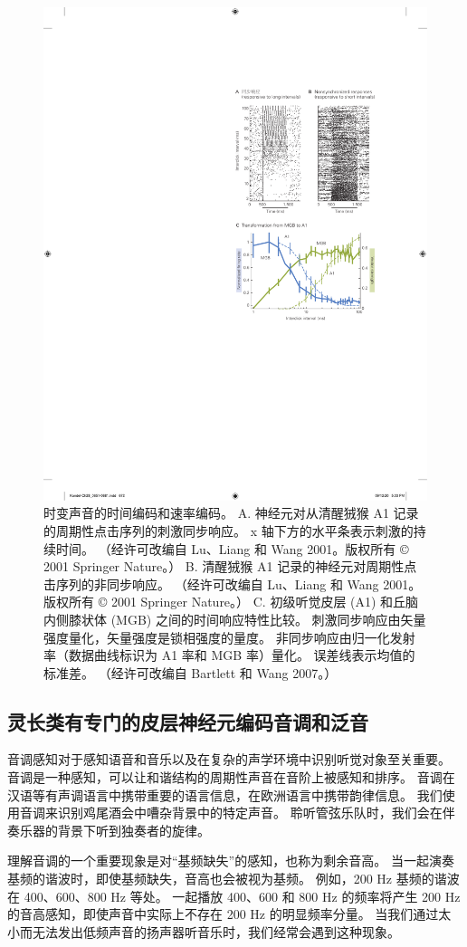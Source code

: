 \begin{figure}[htbp]
	\centering
	\includegraphics[width=0.5\linewidth]{chap28/fig_28_12}
	\caption{时变声音的时间编码和速率编码。
	A. 神经元对从清醒狨猴 A1 记录的周期性点击序列的刺激同步响应。 x 轴下方的水平条表示刺激的持续时间。 
	（经许可改编自 Lu、Liang 和 Wang 2001。版权所有 © 2001 Springer Nature。）
	B. 清醒狨猴 A1 记录的神经元对周期性点击序列的非同步响应。 
	（经许可改编自 Lu、Liang 和 Wang 2001。
	版权所有 © 2001 Springer Nature。） 
	C. 初级听觉皮层 (A1) 和丘脑内侧膝状体 (MGB) 之间的时间响应特性比较。 
	刺激同步响应由矢量强度量化，矢量强度是锁相强度的量度。 
	非同步响应由归一化发射率（数据曲线标识为 A1 率和 MGB 率）量化。 
	误差线表示均值的标准差。 （经许可改编自 Bartlett 和 Wang 2007。）}
	\label{fig:28_12}
\end{figure}

\subsection{灵长类有专门的皮层神经元编码音调和泛音}
音调感知对于感知语音和音乐以及在复杂的声学环境中识别听觉对象至关重要。 
音调是一种感知，可以让和谐结构的周期性声音在音阶上被感知和排序。 
音调在汉语等有声调语言中携带重要的语言信息，在欧洲语言中携带韵律信息。 
我们使用音调来识别鸡尾酒会中嘈杂背景中的特定声音。 
聆听管弦乐队时，我们会在伴奏乐器的背景下听到独奏者的旋律。

理解音调的一个重要现象是对“基频缺失”的感知，也称为剩余音高。 
当一起演奏基频的谐波时，即使基频缺失，音高也会被视为基频。 
例如，200 Hz 基频的谐波在 400、600、800 Hz 等处。 
一起播放 400、600 和 800 Hz 的频率将产生 200 Hz 的音高感知，即使声音中实际上不存在 200 Hz 的明显频率分量。 
当我们通过太小而无法发出低频声音的扬声器听音乐时，我们经常会遇到这种现象。

